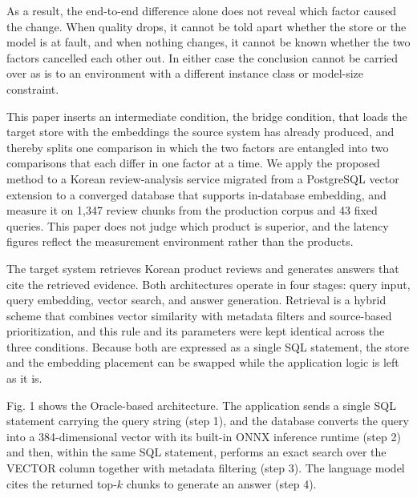 \documentclass[10pt,a4paper,twocolumn]{article}
\newcommand{\pgsec}[1]{\par\vspace{5pt}{\bfseries\fontsize{12}{14}\selectfont #1}\par\nobreak\vspace{2pt}\nobreak}
\newcommand{\pgsubsec}[1]{\par\vspace{4pt}{\bfseries\fontsize{12}{14}\selectfont #1}\par\nobreak\vspace{1pt}\nobreak}
\begin{document}
As a result, the end-to-end difference alone does not reveal which factor caused the change. When quality drops, it cannot be told apart whether the store or the model is at fault, and when nothing changes, it cannot be known whether the two factors cancelled each other out. In either case the conclusion cannot be carried over as is to an environment with a different instance class or model-size constraint.

This paper inserts an intermediate condition, the bridge condition, that loads the target store with the embeddings the source system has already produced, and thereby splits one comparison in which the two factors are entangled into two comparisons that each differ in one factor at a time. We apply the proposed method to a Korean review-analysis service migrated from a PostgreSQL vector extension to a converged database that supports in-database embedding, and measure it on 1,347 review chunks from the production corpus and 43 fixed queries. This paper does not judge which product is superior, and the latency figures reflect the measurement environment rather than the products.

\pgsec{2. Proposed Method}

\pgsubsec{2.1 System Architecture}

The target system retrieves Korean product reviews and generates answers that cite the retrieved evidence. Both architectures operate in four stages: query input, query embedding, vector search, and answer generation. Retrieval is a hybrid scheme that combines vector similarity with metadata filters and source-based prioritization, and this rule and its parameters were kept identical across the three conditions. Because both are expressed as a single SQL statement, the store and the embedding placement can be swapped while the application logic is left as it is.

Fig. 1 shows the Oracle-based architecture. The application sends a single SQL statement carrying the query string (step 1), and the database converts the query into a 384-dimensional vector with its built-in ONNX inference runtime (step 2) and then, within the same SQL statement, performs an exact search over the VECTOR column together with metadata filtering (step 3). The language model cites the returned top-$k$ chunks to generate an answer (step 4).
\end{document}
